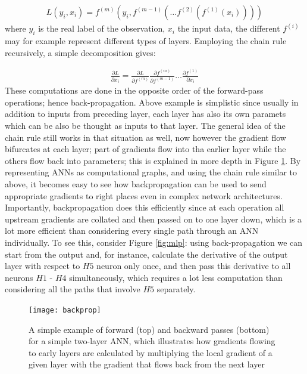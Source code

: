 \documentclass{report}
\begin{document}
\begin{align} \label{bp_eq1}
  L(y_i, x_i) = f^{(m)}(y_i, f^{(m-1)}(\dots f^{(2)}(f^{(1)}(x_i))))
\end{align}
where $y_i$ is the real label of the observation, $x_i$ the input data, the different $f^{(i)}$ may for example represent different types of layers. Employing the chain rule recursively, a simple decomposition gives:

\begin{align} \label{bp_crule}
  \frac{\partial L}{\partial x_i} = \frac{\partial L}{\partial f^{(m)}}\frac{\partial f^{(m)}}{\partial f^{(m-1)}} \dots \frac{\partial f^{(1)}}{\partial x_i}
\end{align}
These computations are done in the opposite order of the forward-pass operations; hence back-propagation. Above example is simplistic since usually in addition to inputs from preceding layer, each layer has also its own paramets which can be also be thought as inputs to that layer. The general idea of the chain rule still works in that situation as well, now however the gradient flow bifurcates at each layer; part of gradients flow into tha earlier layer while the others flow back into parameters; this is explained in more depth in Figure \ref{fig:backprop}. By representing ANNs as computational graphs, and using the chain rule similar to above, it becomes easy to see how backpropagation can be used to send appropriate gradients to right places even in complex network architectures. Importantly, backpropagation does this efficiently since at each operation all upstream gradients are collated and then passed on to one layer down, which is a lot more efficient than considering every single path through an ANN individually. To see this, consider Figure \ref{fig:mlp}: using back-propagation we can start from the output and, for instance, calculate the derivative of the output layer with respect to $H5$ neuron only once, and then pass this derivative to all neurons $H1$ - $H4$ simultaneously, which requires a lot less computation than considering all the paths that involve $H5$ separately. 

\begin{figure}
  \centering
	\texttt{[image: backprop]}
	\caption{A simple example of forward (top) and backward passes (bottom) for a simple two-layer ANN, which illustrates how gradients flowing to early layers are calculated by multiplying the local gradient of a given layer with the gradient that flows back from the next layer}
	\label{fig:backprop}
\end{figure}
\end{document}
